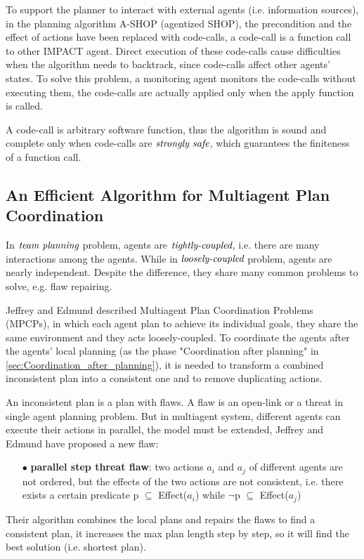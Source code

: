 To support the planner to interact with external agents (i.e. information sources), in the planning algorithm A-SHOP (agentized SHOP), the precondition and the effect of actions have been replaced with code-calls, a code-call is a function call to other IMPACT agent. Direct execution of these code-calls cause difficulties when the algorithm needs to backtrack, since code-calls affect other agents’ states. To solve this problem, a monitoring agent monitors the code-calls without executing them, the code-calls are actually applied only when the apply function is called.

A code-call is arbitrary software function, thus the algorithm is sound and complete only when code-calls are $\emph{strongly safe}$, which guarantees the finiteness of a function call.

\subsection{An Efficient Algorithm for Multiagent Plan Coordination\cite{multi1}}
In $\emph{team planning}$ problem, agents are $\emph{tightly-coupled}$, i.e. there are many interactions among the agents. While in $\emph{loosely-coupled}$ problem, agents are nearly independent. Despite the difference, they share many common problems to solve, e.g. flaw repairing.

Jeffrey and Edmund described Multiagent Plan Coordination Problems (MPCPs), in which each agent plan to achieve its individual goals, they share the same environment and they acts loosely-coupled. To coordinate the agents after the agents’ local planning (as the phase "Coordination after planning" in \autoref{sec:Coordination_after_planning}), it is needed to transform a combined inconsistent plan into a consistent one and to remove duplicating actions.

An inconsistent plan is a plan with flaws. A flaw is an open-link or a threat in single agent planning problem. But in multiagent system, different agents can execute their actions in parallel, the model must be extended, Jeffrey and Edmund have proposed a new flaw: 

\begin{itemize}
\item[$\bullet$] \textbf{parallel step threat flaw}: two actions $a_i$ and $a_j$ of different agents are not ordered, but the effects of the two actions are not consistent, i.e. there exists a certain predicate p $\subseteq$ Effect($a_i$) while $\neg$p $\subseteq$ Effect($a_j$)
\end{itemize}
Their algorithm combines the local plans and repairs the flaws to find a consistent plan, it increases the max plan length step by step, so it will find the best solution (i.e. shortest plan).

